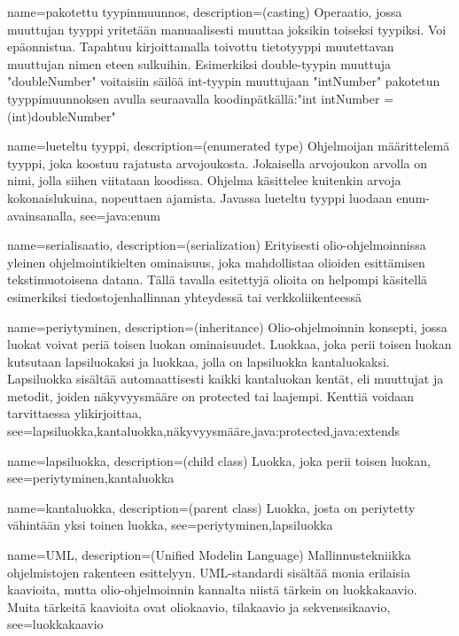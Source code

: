 {
	name=pakotettu tyypinmuunnos,
	description={(casting) Operaatio, jossa muuttujan tyyppi yritetään manuaalisesti muuttaa
joksikin toiseksi tyypiksi. Voi epäonnistua. Tapahtuu kirjoittamalla toivottu tietotyyppi
muutettavan muuttujan nimen eteen sulkuihin. Esimerkiksi double-tyypin muuttuja "doubleNumber"
voitaisiin säilöä int-tyypin muuttujaan "intNumber" pakotetun tyyppimuunnoksen avulla seuraavalla
koodinpätkällä:\newline{}"int intNumber = (int)doubleNumber"}
}

{
	name=lueteltu tyyppi,
	description={(enumerated type) Ohjelmoijan määrittelemä tyyppi, joka koostuu rajatusta
arvojoukosta. Jokaisella arvojoukon arvolla on nimi, jolla siihen viitataan koodissa. Ohjelma
käsittelee kuitenkin arvoja kokonaislukuina, nopeuttaen ajamista. Javassa lueteltu tyyppi luodaan
enum-avainsanalla},
	see={java:enum}
}

{
	name=serialisaatio,
	description={(serialization) Erityisesti olio-ohjelmoinnissa yleinen ohjelmointikielten
ominaisuus, joka mahdollistaa olioiden esittämisen tekstimuotoisena datana. Tällä tavalla
esitettyjä olioita on helpompi käsitellä esimerkiksi tiedostojenhallinnan yhteydessä tai
verkkoliikenteessä}
}

{
	name=periytyminen,
	description={(inheritance) Olio-ohjelmoinnin konsepti, jossa luokat voivat periä toisen luokan
ominaisuudet. Luokkaa, joka perii toisen luokan kutsutaan lapsiluokaksi ja luokkaa, jolla on
lapsiluokka kantaluokaksi. Lapsiluokka sisältää automaattisesti kaikki kantaluokan kentät, eli
muuttujat ja metodit, joiden näkyvyysmääre on protected tai laajempi. Kenttiä voidaan tarvittaessa
ylikirjoittaa},
	see={lapsiluokka,kantaluokka,näkyvyysmääre,java:protected,java:extends}
}

{
	name=lapsiluokka,
	description={(child class) Luokka, joka perii toisen luokan},
	see={periytyminen,kantaluokka}
}

{
	name=kantaluokka,
	description={(parent class) Luokka, josta on periytetty vähintään yksi toinen luokka},
	see={periytyminen,lapsiluokka}
}

{
	name=UML,
	description={(Unified Modelin Language) Mallinnustekniikka ohjelmistojen rakenteen esittelyyn.
UML-standardi sisältää monia erilaisia kaavioita, mutta olio-ohjelmoinnin kannalta niistä tärkein
on luokkakaavio. Muita tärkeitä kaavioita ovat oliokaavio, tilakaavio ja sekvenssikaavio},
	see=luokkakaavio
}

